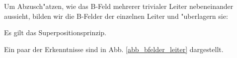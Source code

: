 Um Abzusch"atzen, wie das B-Feld mehrerer trivialer Leiter
nebeneinander aussieht, bilden wir die B-Felder der einzelnen Leiter
und "uberlagern sie:
\begin{Wichtig}
   Es gilt das Superpositionsprinzip.
\end{Wichtig}
Ein paar der Erkenntnisse sind in Abb. \ref{abb_bfelder_leiter} dargestellt.


\begin{figure}
   \centering {}

\end{figure}
